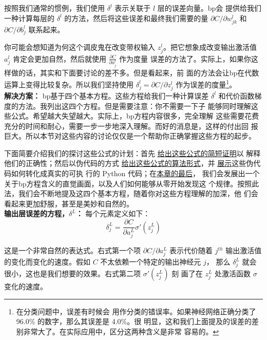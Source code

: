 按照我们通常的惯例，我们使用 $\delta^l$ 表示关联于 $l$ 层的误差向量。\gls*{bp}会
提供给我们一种计算每层的 $\delta^l$ 的方法，然后将这些误差和最终我们需要的量
$\partial C/\partial w_{jk}^l$ 和 $\partial C/\partial b_j^l$ 联系起来。

你可能会想知道为何这个调皮鬼在改变带权输入 $z_j^l$。把它想象成改变输出激活值
$a_j^l$ 肯定会更加自然，然后就使用 $\frac{\partial C}{\partial a_j^l}$ 作为度量
误差的方法了。实际上，如果你这样做的话，其实和下面要讨论的差不多。但是看起来，前
面的方法会让\gls*{bp}在代数运算上变得比较复杂。所以我们坚持使用 $\delta_j^l =
\partial C / \partial z_j^l$ 作为误差的度量\footnote{在分类问题中，误差有时候会
  用作分类的错误率。如果神经网络正确分类了 96.0\% 的数字，那么其误差是 4.0\%。很
  明显，这和我们上面提及的误差的差别非常大了。在实际应用中，区分这两种含义是非常
  容易的。}。\\

\textbf{解决方案：} \gls*{bp}基于四个基本方程。这些方程给我们一种计算误差
$\delta^l$ 和代价函数梯度的方法。我列出这四个方程。但是需要注意：你不需要一下子
能够同时理解这些公式。希望越大失望越大。实际上，\gls*{bp}方程内容很多，完全理解
这些需要花费充分的时间和耐心，需要一步一步地深入理解。而好的消息是，这样的付出回
报巨大。所以本节对这些内容的讨论仅仅是一个帮助你正确掌握这些方程的起步。

下面简要介绍我们的探讨这些公式的计划：首先%
\hyperref[sec:proof_of_the_four_fundamental_equations]{给出这些公式的简短证明}以
解释他们的正确性；然后以伪代码的方式%
\hyperref[sec:the_backpropagation_algorithm]{给出这些公式的算法形式}，并%
\hyperref[sec:the_code_for_backpropagation]{展示}这些伪代码如何转化成真实的可执
行的 Python 代码；在\hyperref[sec:backpropagation_the_big_picture]{本章的最后}，
我们会发展出一个关于\gls*{bp}方程含义的直觉画面，以及人们如何能够从零开始发现这
个规律。按照此法，我们会不断地提及这四个基本方程，随着你对这些方程理解的加深，他
们会看起来更加舒服，甚至是美妙和自然的。\\

\textbf{输出层误差的方程，$\delta^L$：} 每个元素定义如下：
\begin{equation}
  \delta^L_j = \frac{\partial C}{\partial a^L_j} \sigma'(z^L_j)
  \label{eq:bp1}\tag{BP1}
\end{equation}

这是一个非常自然的表达式。右式第一个项 $\partial C/\partial a_j^L$ 表示代价随着
$j^{th}$ 输出激活值的变化而变化的速度。假如 $C$ 不太依赖一个特定的输出神经元 $j$，
那么 $\delta_j^L$ 就会很小，这也是我们想要的效果。右式第二项 $\sigma'(z_j^L)$ 刻
画了在 $z_j^L$ 处激活函数 $\sigma$ 变化的速度。

